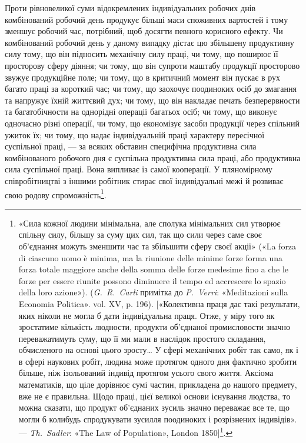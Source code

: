 Проти рівновеликої суми відокремлених індивідуальних робочих
днів комбінований робочий день продукує більші маси споживних
вартостей і тому зменшує робочий час, потрібний, щоб
досягти певного корисного ефекту. Чи комбінований робочий
день у даному випадку дістає цю збільшену продуктивну силу
тому, що він підносить механічну силу праці, чи тому, що поширює
її просторову сферу діяння; чи тому, що він супроти маштабу
продукції просторово звужує продукційне поле; чи тому, що в
критичний момент він пускає в рух багато праці за короткий час;
чи тому, що заохочує поодиноких осіб до змагання та напружує
їхній життєвий дух; чи тому, що він накладає печать безперервности
та багатобічности на однорідні операції багатьох осіб; чи
тому, що виконує одночасно різні операції, чи тому, що економізує
засоби продукції через спільний ужиток їх; чи тому, що надає
індивідуальній праці характеру пересічної суспільної праці, —
за всяких обставин специфічна продуктивна сила комбінованого
робочого дня є суспільна продуктивна сила праці, або продуктивна
сила суспільної праці. Вона випливає із самої кооперації. У пляномірному
співробітництві з іншими робітник стирає свої індивідуальні
межі й розвиває свою родову спроможність\footnote{
«Сила кожної людини мінімальна, але сполука мінімальних сил
утворює спільну силу, більшу за суму цих сил, так що сили через саме
своє об’єднання можуть зменшити час та збільшити сферу своєї акції»
(«La forza di ciascuno uomo è minima, ma la riunione delle minime forze
forma una forza totale maggiore anche della somma delle forze medesime
fino a che le forze per essere riunite possono diminuere il tempo ed accrescere
lo spazio della loro azione»). (\emph{G.~R.~Carli} примітка до \emph{P.~Verri}: «Meditazioni
sulla Economia Politica». vol. XV, p. 196). [«Колективна
праця дає такі результати, яких ніколи не могла б дати індивідуальна
праця. Отже, у міру того як зростатиме кількість людности, продукти
об’єднаної промисловости значно переважатимуть суму, що її ми мали
в наслідок простого складання, обчисленого на основі цього зросту\dots{}
У сфері механічних робіт так само, як і в сфері наукових робіт, людина
може протягом одного дня фактично зробити більше, ніж ізольований
індивід протягом усього свого життя. Аксіома математиків, що ціле
дорівнює сумі частин, прикладена до нашого предмету, вже не є правильна.
Щодо праці, цієї великої основи існування людства, то можна
сказати, що продукт об’єднаних зусиль значно переважає все те, що
могли б колибудь спродукувати зусилля поодиноких і розрізнених індивідів».
— \emph{Th.~Sadler}: «The Law of Population», London 1850]\footnote*{
Наведене тут у прямих дужках ми беремо з французького видання.
(«Le Capital etc.», v. I, ch. XIII, p. 143). \emph{Ред.}
}.
}.
